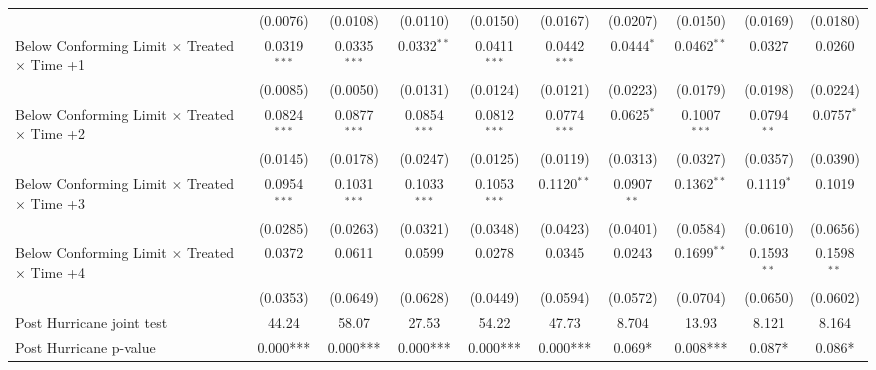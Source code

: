 \begin{tabular}{lccccccccc}
                                                              & (0.0076)       & (0.0108)       & (0.0110)       & (0.0150)       & (0.0167)       & (0.0207)      & (0.0150)       & (0.0169)      & (0.0180)\\   
   Below Conforming Limit $\times$ Treated $\times$ Time +1   & 0.0319$^{***}$ & 0.0335$^{***}$ & 0.0332$^{**}$  & 0.0411$^{***}$ & 0.0442$^{***}$ & 0.0444$^{*}$  & 0.0462$^{**}$  & 0.0327        & 0.0260\\   
                                                              & (0.0085)       & (0.0050)       & (0.0131)       & (0.0124)       & (0.0121)       & (0.0223)      & (0.0179)       & (0.0198)      & (0.0224)\\   
   Below Conforming Limit $\times$ Treated $\times$ Time +2   & 0.0824$^{***}$ & 0.0877$^{***}$ & 0.0854$^{***}$ & 0.0812$^{***}$ & 0.0774$^{***}$ & 0.0625$^{*}$  & 0.1007$^{***}$ & 0.0794$^{**}$ & 0.0757$^{*}$\\   
                                                              & (0.0145)       & (0.0178)       & (0.0247)       & (0.0125)       & (0.0119)       & (0.0313)      & (0.0327)       & (0.0357)      & (0.0390)\\   
   Below Conforming Limit $\times$ Treated $\times$ Time +3   & 0.0954$^{***}$ & 0.1031$^{***}$ & 0.1033$^{***}$ & 0.1053$^{***}$ & 0.1120$^{**}$  & 0.0907$^{**}$ & 0.1362$^{**}$  & 0.1119$^{*}$  & 0.1019\\   
                                                              & (0.0285)       & (0.0263)       & (0.0321)       & (0.0348)       & (0.0423)       & (0.0401)      & (0.0584)       & (0.0610)      & (0.0656)\\   
   Below Conforming Limit $\times$ Treated $\times$ Time +4   & 0.0372         & 0.0611         & 0.0599         & 0.0278         & 0.0345         & 0.0243        & 0.1699$^{**}$  & 0.1593$^{**}$ & 0.1598$^{**}$\\   
                                                              & (0.0353)       & (0.0649)       & (0.0628)       & (0.0449)       & (0.0594)       & (0.0572)      & (0.0704)       & (0.0650)      & (0.0602)\\   
   Post Hurricane joint test                                  & 44.24          & 58.07          & 27.53          & 54.22          & 47.73          & 8.704         & 13.93          & 8.121         & 8.164\\  
   Post Hurricane p-value                                     & 0.000***       & 0.000***       & 0.000***       & 0.000***       & 0.000***       & 0.069*        & 0.008***       & 0.087*        & 0.086*\\  

\end{tabular}

